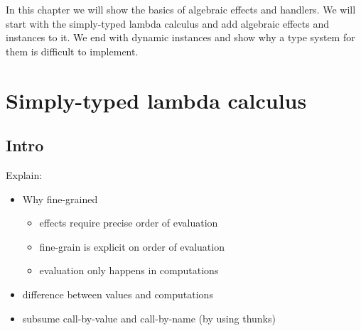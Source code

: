 {
\newcommand\ty[0]{\tau}
\newcommand\tunit[0]{()}
\newcommand\tarr[2]{#1 \rightarrow #2}
\newcommand\thandler[2]{#1 \Rightarrow #2}
\newcommand\tforall[3]{\forall(#1:#2) . #3}

\newcommand\cty[0]{\underline{\ty}}
\newcommand\aty[2]{#1 \; ! \; #2}
\newcommand\texists[3]{\exists(#1:#2) . #3}
\newcommand\texistss[2]{\exists \overrightarrow{#1} . #2}

\newcommand\val[0]{\nu}
\newcommand\vunit[0]{()}
\newcommand\vinst[1]{\mathsf{inst}(#1)}
\newcommand\vabst[3]{\Lambda(#1:#2) . #3}
\newcommand\vabs[2]{\lambda #1 . #2}
\newcommand\vappt[2]{#1 \; [ #2 ]}
\newcommand\vhandler[1]{\textit{handler} \; \{#1\}}
\newcommand\vhandleri[2]{\textit{handler} ( #1 ) \; \{#2\}}
\newcommand\vhandlerc[0]{\vhandler{
	\textit{return} \; x \rightarrow \comp,
	\op_1(x ; k) \rightarrow \comp,
	...,
	\op_n(x ; k) \rightarrow \comp
}}
\newcommand\vhandlerci[1]{\vhandleri{#1}{
	\textit{return} \; x \rightarrow \comp,
	\op_1(x ; k) \rightarrow \comp,
	...,
	\op_n(x ; k) \rightarrow \comp
}}

\newcommand\comp[0]{c}
\newcommand\creturn[1]{\textit{return} \; #1}
\newcommand\capp[2]{#1 \; #2}
\newcommand\cdo[3]{#1 \leftarrow #2 ; #3}
\newcommand\cop[4]{#1(#2 ; #3 . #4)}
\newcommand\copi[5]{#1 \# #2(#3 ; #4 . #5)}
\newcommand\chandle[2]{\textit{with} \; #1 \; \textit{handle} \; #2}
\newcommand\cnew[1]{\textit{new} \; #1}
\newcommand\cunpack[4]{(#1, #2) \leftarrow #3 ; #4}

In this chapter we will show the basics of algebraic effects and handlers. We will start with the simply-typed lambda calculus and add algebraic effects and instances to it. We end with dynamic instances and show why a type system for them is difficult to implement.

\section{Simply-typed lambda calculus}

\subsection{Intro}


Explain:
\begin{itemize}
	\item Why fine-grained
	\begin{itemize}
		\item effects require precise order of evaluation
		\item fine-grain is explicit on order of evaluation
		\item evaluation only happens in computations
	\end{itemize}
	\item difference between values and computations
	\item subsume call-by-value and call-by-name (by using thunks)
\end{itemize}

}
